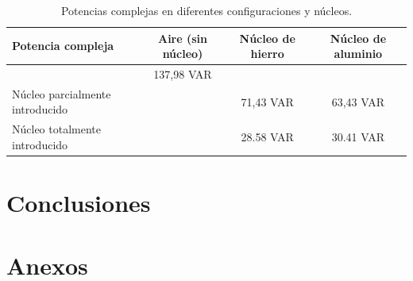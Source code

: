 \documentclass{article}
\begin{document}
            \begin{table}[H]
                \centering
                \begin{tabular}{|l|c|c|c|}
                \hline
                Potencia compleja                    & Aire (sin núcleo)  & Núcleo de hierro & Núcleo de aluminio \\ \hline
                                                    &  137,98 VAR        &                  &                     \\ \hline
                Núcleo parcialmente introducido     &                    &  71,43 VAR       &  63,43 VAR          \\ \hline
                Núcleo totalmente introducido       &                    &   28.58 VAR      &  30.41 VAR           \\ \hline
                \end{tabular}
                \caption{Potencias complejas en diferentes configuraciones y núcleos.}
                \label{tab:PotenciasComplejas}
            \end{table}


    \section{Conclusiones}

    \section{Anexos}
\end{document}
